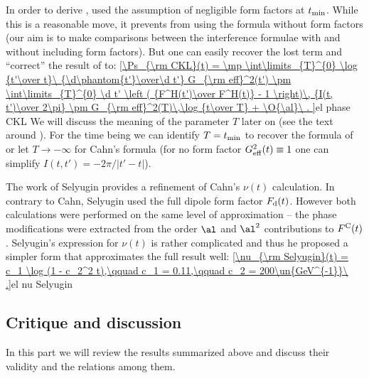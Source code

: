 In order to derive , \KaL{} used the assumption of negligible form factors at $t_{\rm min}$. While this is a reasonable move, it prevents from using the formula without form factors (our aim is to make comparisons between the interference formulae with and without including form factors). But one can easily recover the lost term and ``correct'' the result of \KL{} to:
\eqref{\Ps_{\rm CKL}(t) =
	\mp \int\limits_{T}^{0} \log {t'\over t}\ {\d\phantom{t'}\over\d t'} G_{\rm eff}^2(t')
	\pm \int\limits_{T}^{0} \d t' \left ( {F^H(t')\over F^H(t)} - 1 \right)\, {I(t, t')\over 2\pi}
	\pm G_{\rm eff}^2(T)\,\log {t\over T}
	+ \O{\al}\ .
}{el phase CKL}
We will discuss the meaning of the parameter $T$ later on (see the text around ). For the time being we can identify $T = t_{\rm min}$ to recover the formula of \KL{} or let $T\to -\infty$ for Cahn's formula (for no form factor $G_{\rm eff}^2(t) \equiv 1$ one can simplify $I(t, t') = -2\pi / |t' - t|$).

The work of Selyugin  provides a refinement of Cahn's $\nu(t)$ calculation. In contrary to Cahn, Selyugin used the full dipole form factor $F_{\rm d}(t)$. However both calculations were performed on the same level of approximation -- the phase modifications were extracted from the order $\al$ and $\al^2$ contributions to $F^{\rm C}(t)$. Selyugin's expression for $\nu(t)$ is rather complicated and thus he proposed a simpler form that approximates the full result well:
\eqref{\nu_{\rm Selyugin}(t) = c_1 \log (1 - c_2^2 t),\qquad c_1 = 0.11,\qquad c_2 = 200\un{GeV^{-1}}\ .}{el nu Selyugin}


\subsection[int cd]{Critique and discussion}

In this part we will review the results summarized above and discuss their validity and the relations among them.


